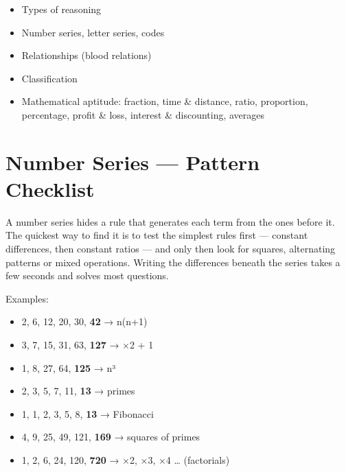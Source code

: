 

\begin{sylbox}

\begin{itemize}
\tightlist
\item[$\square$]
  Types of reasoning
\item[$\square$]
  Number series, letter series, codes
\item[$\square$]
  Relationships (blood relations)
\item[$\square$]
  Classification
\item[$\square$]
  Mathematical aptitude: fraction, time \& distance, ratio, proportion, percentage, profit \& loss,
  interest \& discounting, averages
\end{itemize}

\end{sylbox}

\needspace{125pt}

\hypertarget{p1-05--1-number-series--pattern-checklist}{%
\section{Number Series --- Pattern Checklist}\label{p1-05--1-number-series--pattern-checklist}}

A number series hides a rule that generates each term from the ones before it. The quickest way to find it is
to test the simplest rules first --- constant differences, then constant ratios --- and only then look for
squares, alternating patterns or mixed operations. Writing the differences beneath the series takes a few
seconds and solves most questions.



Examples:

\begin{itemize}
\tightlist
\item
  2, 6, 12, 20, 30, \textbf{42} → n(n+1)
\item
  3, 7, 15, 31, 63, \textbf{127} → ×2 + 1
\item
  1, 8, 27, 64, \textbf{125} → n³
\item
  2, 3, 5, 7, 11, \textbf{13} → primes
\item
  1, 1, 2, 3, 5, 8, \textbf{13} → Fibonacci
\item
  4, 9, 25, 49, 121, \textbf{169} → squares of primes
\item
  1, 2, 6, 24, 120, \textbf{720} → ×2, ×3, ×4 \ldots{} (factorials)
\end{itemize}


